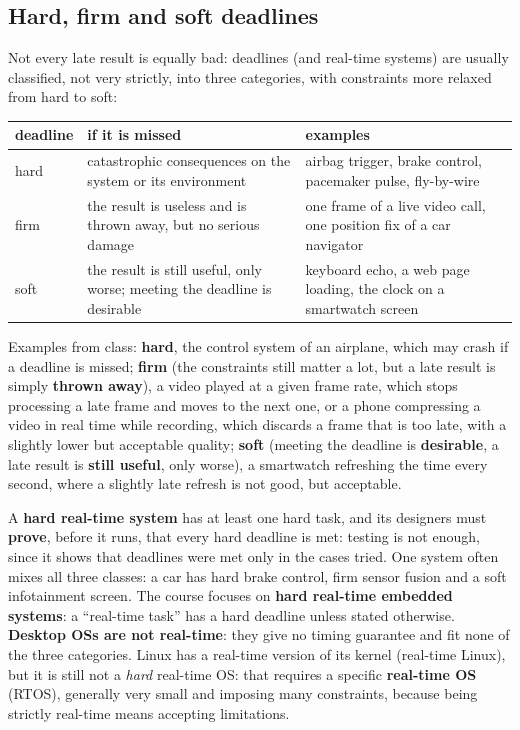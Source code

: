 \subsection{Hard, firm and soft deadlines}
Not every late result is equally bad: deadlines (and real-time systems) are usually classified, not very strictly, into three categories, with constraints more relaxed from hard to soft:
\begin{center}
\begin{tabular}{l p{5.2cm} p{5.2cm}}
\hline
\textbf{deadline} & \textbf{if it is missed} & \textbf{examples} \\
\hline
hard & catastrophic consequences on the system or its environment & airbag trigger, brake control, pacemaker pulse, fly-by-wire \\
firm & the result is useless and is thrown away, but no serious damage & one frame of a live video call, one position fix of a car navigator \\
soft & the result is still useful, only worse; meeting the deadline is desirable & keyboard echo, a web page loading, the clock on a smartwatch screen \\
\hline
\end{tabular}
\end{center}
Examples from class: \textbf{hard}, the control system of an airplane, which may crash if a deadline is missed; \textbf{firm} (the constraints still matter a lot, but a late result is simply \textbf{thrown away}), a video played at a given frame rate, which stops processing a late frame and moves to the next one, or a phone compressing a video in real time while recording, which discards a frame that is too late, with a slightly lower but acceptable quality; \textbf{soft} (meeting the deadline is \textbf{desirable}, a late result is \textbf{still useful}, only worse), a smartwatch refreshing the time every second, where a slightly late refresh is not good, but acceptable.

A \textbf{hard real-time system} has at least one hard task, and its designers must \textbf{prove}, before it runs, that every hard deadline is met: testing is not enough, since it shows that deadlines were met only in the cases tried. One system often mixes all three classes: a car has hard brake control, firm sensor fusion and a soft infotainment screen. The course focuses on \textbf{hard real-time embedded systems}: a ``real-time task'' has a hard deadline unless stated otherwise. \textbf{Desktop OSs are not real-time}: they give no timing guarantee and fit none of the three categories. Linux has a real-time version of its kernel (real-time Linux), but it is still not a \emph{hard} real-time OS: that requires a specific \textbf{real-time OS} (RTOS), generally very small and imposing many constraints, because being strictly real-time means accepting limitations.

